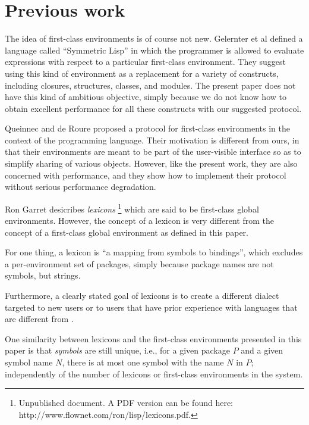 \section{Previous work}

The idea of first-class environments is of course not new.
Gelernter et al \cite{Gelernter:1987:EFC:41625.41634} defined a
language called ``Symmetric Lisp'' in which the programmer is allowed
to evaluate expressions with respect to a particular first-class
environment.  They suggest using this kind of environment as a
replacement for a variety of constructs, including closures,
structures, classes, and modules.  The present paper does not have
this kind of ambitious objective, simply because we do not know how to
obtain excellent performance for all these constructs with our
suggested protocol.

Queinnec and de Roure \cite{Queinnec:1996:SCT:232627.232653} proposed
a protocol for first-class environments in the context of the
\scheme{} programming language.  Their motivation is different from
ours, in that their environments are meant to be part of the
user-visible interface so as to simplify sharing of various objects.
However, like the present work, they are also concerned with
performance, and they show how to implement their protocol without
serious performance degradation.

Ron Garret desicribes \emph{lexicons}%
\footnote{Unpublished document.  A PDF version can be found here:
  http://www.flownet.com/ron/lisp/lexicons.pdf.}
which are said to be first-class global environments.  However, the
concept of a lexicon is very different from the concept of a
first-class global environment as defined in this paper.

For one thing, a lexicon is ``a mapping from symbols to bindings'',
which excludes a per-environment set of packages, simply because
package names are not symbols, but strings.

Furthermore, a clearly stated goal of lexicons is to create a
different \lisp{} dialect targeted to new users or to users that have
prior experience with languages that are different from \lisp{}.

One similarity between lexicons and the first-class environments
presented in this paper is that \emph{symbols} are still unique, i.e.,
for a given package $P$ and a given symbol name $N$, there is at most
one symbol with the name $N$ in $P$; independently of the number of
lexicons or first-class environments in the system.
